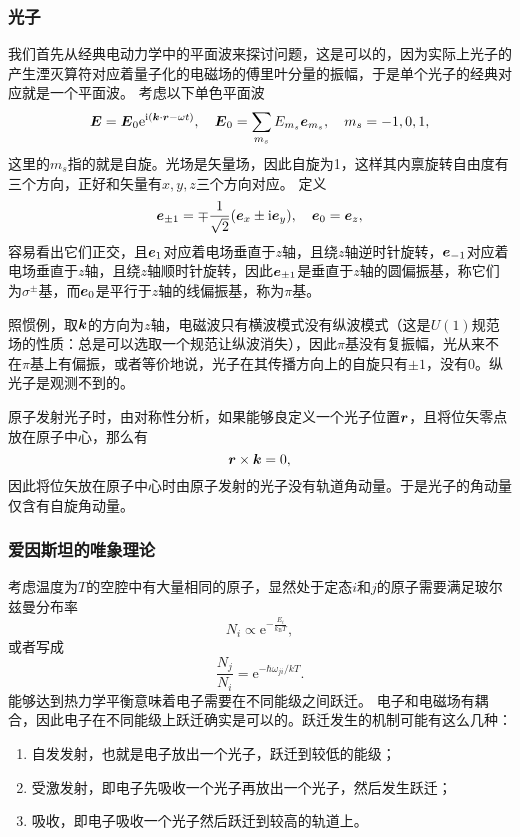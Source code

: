 \documentclass[UTF8, a4paper]{ctexart}
\newcommand*{\ee}{\mathrm{e}}
\newcommand*{\ii}{\mathrm{i}}
\begin{document}
\subsubsection{光子}

我们首先从经典电动力学中的平面波来探讨问题，这是可以的，因为实际上光子的产生湮灭算符对应着量子化的电磁场的傅里叶分量的振幅，于是单个光子的经典对应就是一个平面波。
考虑以下单色平面波
\begin{equation}
    \vb*{E} = \vb*{E}_0 \ee^{\ii(\vb*{k} \cdot \vb*{r} - \omega t)}, \quad \vb*{E}_0 = \sum_{m_s} E_{m_s} \vb*{e}_{m_s}, \quad m_s = -1, 0, 1,
\end{equation}
这里的$m_s$指的就是自旋。光场是矢量场，因此自旋为1，这样其内禀旋转自由度有三个方向，正好和矢量有$x, y, z$三个方向对应。
定义
\begin{equation}
    \vb*{e}_{\pm 1} = \mp \frac{1}{\sqrt{2}} (\vb*{e}_x \pm \ii \vb*{e}_y), \quad \vb*{e}_0 = \vb*{e}_z,
\end{equation}
容易看出它们正交，且$\vb*{e}_1$对应着电场垂直于$z$轴，且绕$z$轴逆时针旋转，$\vb*{e}_{-1}$对应着电场垂直于$z$轴，且绕$z$轴顺时针旋转，因此$\vb*{e}_{\pm 1}$是垂直于$z$轴的圆偏振基，称它们为$\sigma^\pm$基，而$\vb*{e}_0$是平行于$z$轴的线偏振基，称为$\pi$基。

照惯例，取$\vb*{k}$的方向为$z$轴，电磁波只有横波模式没有纵波模式（这是$U(1)$规范场的性质：总是可以选取一个规范让纵波消失），因此$\pi$基没有复振幅，光从来不在$\pi$基上有偏振，或者等价地说，光子在其传播方向上的自旋只有$\pm 1$，没有$0$。纵光子是观测不到的。

原子发射光子时，由对称性分析，如果能够良定义一个光子位置$\vb*{r}$，且将位矢零点放在原子中心，那么有
\[
    \vb*{r} \times \vb*{k} = 0,
\]
因此将位矢放在原子中心时由原子发射的光子没有轨道角动量。于是光子的角动量仅含有自旋角动量。

\subsubsection{爱因斯坦的唯象理论}\label{sec:einstein-phonomenon}

考虑温度为$T$的空腔中有大量相同的原子，显然处于定态$i$和$j$的原子需要满足玻尔兹曼分布率
\[
    N_i \propto \ee^{-\frac{E_i}{k_\text{B} T}},
\]
或者写成
\[
    \frac{N_j}{N_i} = \ee^{-\hbar \omega_{ji} / kT}.
\]
能够达到热力学平衡意味着电子需要在不同能级之间跃迁。
电子和电磁场有耦合，因此电子在不同能级上跃迁确实是可以的。跃迁发生的机制可能有这么几种：
\begin{enumerate}
    \item 自发发射，也就是电子放出一个光子，跃迁到较低的能级；
    \item 受激发射，即电子先吸收一个光子再放出一个光子，然后发生跃迁；
    \item 吸收，即电子吸收一个光子然后跃迁到较高的轨道上。
\end{enumerate}
\end{document}
